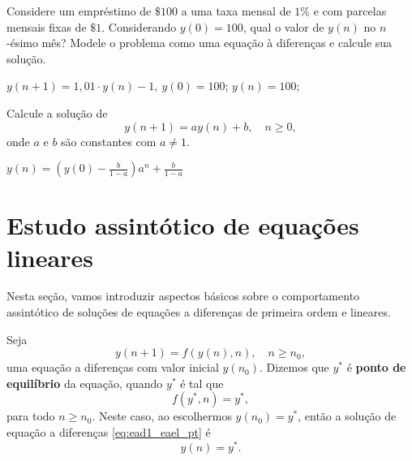 \begin{exer}
  Considere um empréstimo de $\$ 100$ a uma taxa mensal de $1\%$ e com parcelas mensais fixas de $\$ 1$. Considerando $y(0)=100$, qual o valor de $y(n)$ no $n$-ésimo mês? Modele o problema como uma equação à diferenças e calcule sua solução.
\end{exer}
\begin{resp}
  $y(n+1)=1,01\cdot y(n)-1,~y(0)=100$; $y(n)=100$;
\end{resp}

\begin{exer}
  Calcule a solução de
  \begin{equation}
    y(n+1) = ay(n) + b,\quad n\geq 0,
  \end{equation}
  onde $a$ e $b$ são constantes com $a\neq 1$.
\end{exer}
\begin{resp}
  $\displaystyle y(n) = \left(y(0)-\frac{b}{1-a}\right)a^n + \frac{b}{1-a}$
\end{resp}

\section{Estudo assintótico de equações lineares}\label{cap_ead1_sec_eael}

Nesta seção, vamos introduzir aspectos básicos sobre o comportamento assintótico de soluções de equações a diferenças de primeira ordem e lineares.

Seja
\begin{equation}\label{eq:ead1_eael_pt}
  y(n+1) = f(y(n),n),\quad n\geq n_0,
\end{equation}
uma equação a diferenças com valor inicial $y(n_0)$. Dizemos que $y^*$ é {\bf ponto de equilíbrio} da equação, quando $y^*$ é tal que
\begin{equation}\label{eq:ead1_eael_eq}
  f(y^*,n) = y^*,
\end{equation}
para todo $n\geq n_0$.  Neste caso, ao escolhermos $y(n_0)=y^*$, então a solução de equação a diferenças \eqref{eq:ead1_eael_pt} é
\begin{equation}
  y(n) = y^*.
\end{equation}

